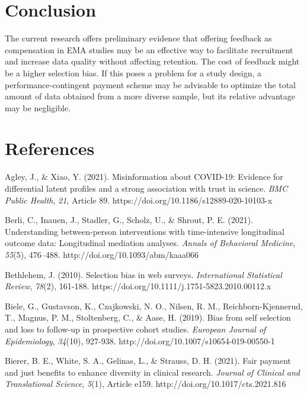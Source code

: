 \documentclass[authordate, empirical]{jote-new-article}
\begin{document}
	\section{Conclusion}



	The current research offers preliminary evidence that offering feedback as compensation in EMA studies may be an effective way to facilitate recruitment and increase data quality without affecting retention. The cost of feedback might be a higher selection bias. If this poses a problem for a study design, a performance-contingent payment scheme may be advisable to optimize the total amount of data obtained from a more diverse sample, but its relative advantage may be negligible.



	\section{References}



	Agley, J., \& Xiao, Y. (2021). Misinformation about COVID-19: Evidence for differential latent profiles and a strong association with trust in science. \emph{BMC Public Health},\emph{ 21}, Article 89. https://doi.org/10.1186/s12889-020-10103-x



	Berli, C., Inauen, J., Stadler, G., Scholz, U., \& Shrout, P. E. (2021). Understanding between-person interventions with time-intensive longitudinal outcome data: Longitudinal mediation analyses. \emph{Annals of Behavioral Medicine},\emph{ 55}(5), 476--488. http://doi.org/10.1093/abm/kaaa066



	Bethlehem, J. (2010). Selection bias in web surveys. \emph{International Statistical Review},\emph{ 78}(2), 161-188. https://doi.org/10.1111/j.1751-5823.2010.00112.x



	Biele, G., Gustavson, K., Czajkowski, N. O., Nilsen, R. M., Reichborn-Kjennerud, T., Magnus, P. M., Stoltenberg, C., \& Aase, H. (2019). Bias from self selection and loss to follow-up in prospective cohort studies. \emph{European Journal of Epidemiology},\emph{ 34}(10), 927-938. http://doi.org/10.1007/s10654-019-00550-1



	Bierer, B. E., White, S. A., Gelinas, L., \& Strauss, D. H. (2021). Fair payment and just benefits to enhance diversity in clinical research. \emph{Journal of Clinical and Translational Science},\emph{ 5}(1), Article e159. http://doi.org/10.1017/cts.2021.816
\end{document}
